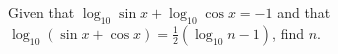 Given that $\log_{10} \sin x + \log_{10} \cos x = -1$ and that $\log_{10} (\sin x + \cos x) = \textstyle \frac{1}{2} (\log_{10} n - 1)$, find $n$.